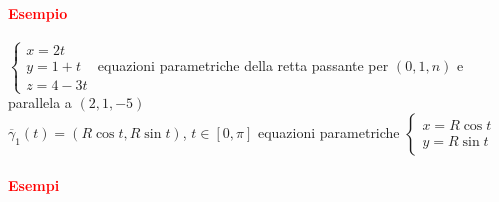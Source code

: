 \documentclass{article}
\begin{document}
\paragraph{\textcolor{red}{Esempio}}
$\begin{cases}
    x=2t\\
    y=1+t\\
    z=4-3t
\end{cases}$
equazioni parametriche della retta passante per $(0,1,n)$ e parallela a $(2,1,-5)$\\
$\overline{\gamma}_1(t)=(R\cos t, R \sin t)$, $t \in [0,\pi]$ equazioni parametriche $\begin{cases}
    x=R \cos t\\
    y=R \sin t
\end{cases}$

\paragraph{\textcolor{red}{Esempi}}
\end{document}
